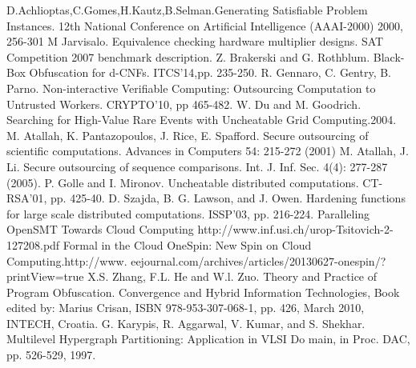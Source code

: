 \documentclass[conference,compsocconf]{IEEEtran}
\begin{document}
\begin{thebibliography}{26}
D.Achlioptas,C.Gomes,H.Kautz,B.Selman.Generating Satisfiable Problem Instances.
 12th National Conference on Artificial Intelligence (AAAI-2000) 2000, 256-301
M Jarvisalo. Equivalence checking hardware multiplier designs.
SAT Competition 2007 benchmark description.
Z. Brakerski and G. Rothblum.
Black-Box Obfuscation for d-CNFs.
ITCS'14,pp. 235-250.
R. Gennaro, C. Gentry, B. Parno.
Non-interactive Verifiable Computing: Outsourcing Computation to Untrusted Workers.
CRYPTO'10, pp 465-482.
W. Du and M. Goodrich.
Searching for High-Value Rare Events with Uncheatable Grid Computing.2004.
M. Atallah, K. Pantazopoulos, J. Rice, E. Spafford.
Secure outsourcing of scientific computations.
Advances in Computers 54: 215-272 (2001)
M. Atallah, J. Li.
Secure outsourcing of sequence comparisons.
Int. J. Inf. Sec. 4(4): 277-287 (2005).
P. Golle and I. Mironov.
Uncheatable distributed computations.
CT-RSA'01, pp. 425-40.
D. Szajda, B. G. Lawson, and J. Owen.
Hardening functions for large scale distributed computations.
ISSP'03, pp. 216-224.
Paralleling OpenSMT Towards Cloud Computing http://www.inf.usi.ch/urop-Tsitovich-2-127208.pdf
Formal in the Cloud OneSpin: New Spin on Cloud Computing.http://www. eejournal.com/archives/articles/20130627-onespin/?printView=true
X.S. Zhang, F.L. He and W.l. Zuo. Theory and Practice of Program Obfuscation.
Convergence and Hybrid Information Technologies, Book edited by: Marius Crisan, ISBN 978-953-307-068-1, pp. 426, March 2010, INTECH, Croatia.
 G. Karypis, R. Aggarwal, V. Kumar, and S. Shekhar.
Multilevel Hypergraph Partitioning: Application in VLSI Do main, in Proc. DAC, pp. 526-529, 1997.

\end{thebibliography}



\end{document}
